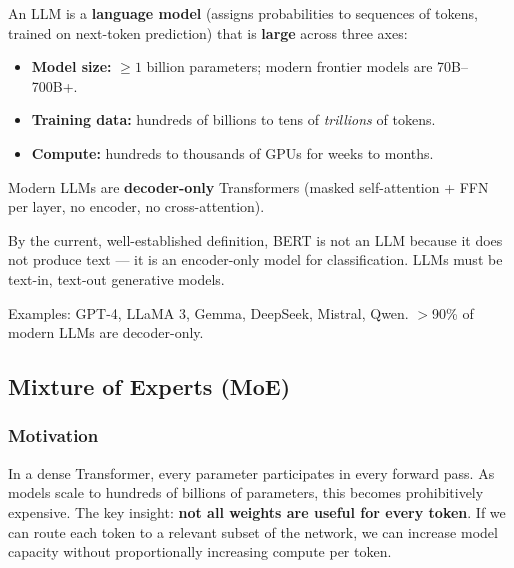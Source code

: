 \documentclass[11pt, a4paper]{article}
\begin{document}
\begin{defbox}
An LLM is a \textbf{language model} (assigns probabilities to sequences of tokens, trained on next-token prediction) that is \textbf{large} across three axes:
\begin{itemize}[leftmargin=1.5em]
  \item \textbf{Model size:} $\geq 1$ billion parameters; modern frontier models are 70B--700B+.
  \item \textbf{Training data:} hundreds of billions to tens of \emph{trillions} of tokens.
  \item \textbf{Compute:} hundreds to thousands of GPUs for weeks to months.
\end{itemize}
Modern LLMs are \textbf{decoder-only} Transformers (masked self-attention + FFN per layer, no encoder, no cross-attention).
\end{defbox}

\begin{warnbox}
By the current, well-established definition, BERT is not an LLM because it does not produce text --- it is an encoder-only model for classification. LLMs must be text-in, text-out generative models.
\end{warnbox}

Examples: GPT-4, LLaMA 3, Gemma, DeepSeek, Mistral, Qwen. $>$90\% of modern LLMs are decoder-only.

\subsection{Mixture of Experts (MoE)}

\subsubsection{Motivation}

\begin{defbox}
In a dense Transformer, every parameter participates in every forward pass. As models scale to hundreds of billions of parameters, this becomes prohibitively expensive. The key insight: \textbf{not all weights are useful for every token}. If we can route each token to a relevant subset of the network, we can increase model capacity without proportionally increasing compute per token.
\end{defbox}
\end{document}
